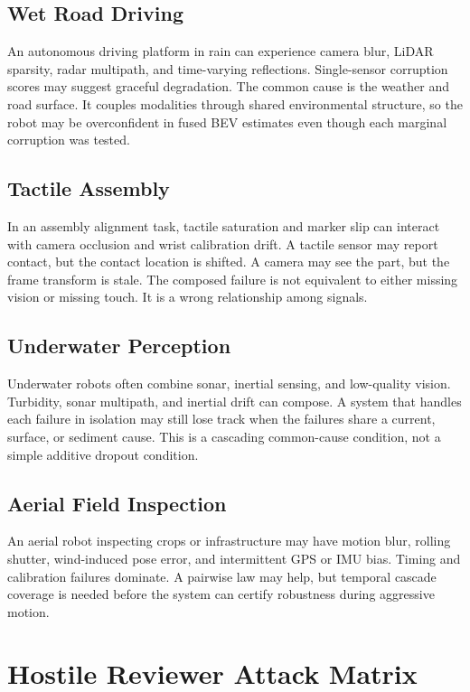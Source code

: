 \documentclass{article}
\begin{document}
\subsection{Wet Road Driving}

An autonomous driving platform in rain can experience camera blur, LiDAR sparsity, radar multipath, and time-varying reflections. Single-sensor corruption scores may suggest graceful degradation. The common cause is the weather and road surface. It couples modalities through shared environmental structure, so the robot may be overconfident in fused BEV estimates even though each marginal corruption was tested.

\subsection{Tactile Assembly}

In an assembly alignment task, tactile saturation and marker slip can interact with camera occlusion and wrist calibration drift. A tactile sensor may report contact, but the contact location is shifted. A camera may see the part, but the frame transform is stale. The composed failure is not equivalent to either missing vision or missing touch. It is a wrong relationship among signals.

\subsection{Underwater Perception}

Underwater robots often combine sonar, inertial sensing, and low-quality vision. Turbidity, sonar multipath, and inertial drift can compose. A system that handles each failure in isolation may still lose track when the failures share a current, surface, or sediment cause. This is a cascading common-cause condition, not a simple additive dropout condition.

\subsection{Aerial Field Inspection}

An aerial robot inspecting crops or infrastructure may have motion blur, rolling shutter, wind-induced pose error, and intermittent GPS or IMU bias. Timing and calibration failures dominate. A pairwise law may help, but temporal cascade coverage is needed before the system can certify robustness during aggressive motion.

\section{Hostile Reviewer Attack Matrix}
\end{document}
